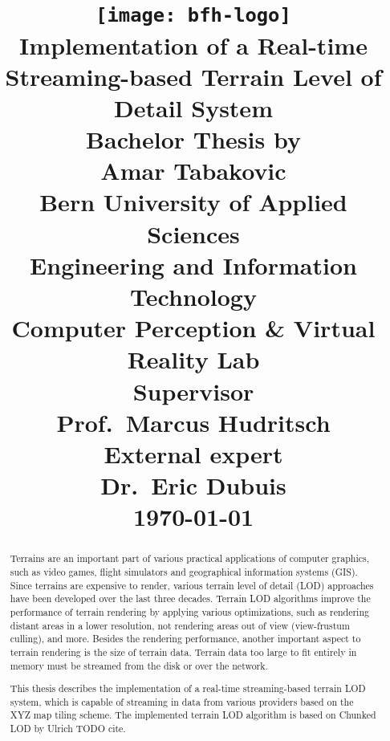 \documentclass[10pt,a4paper]{report}
\begin{document}
\title{
\vspace{-80px}
\texttt{[image: bfh-logo]}\\
\vspace{80px}
\huge\textsf{\textbf{Implementation of a Real-time Streaming-based Terrain Level of Detail System}}\\
\vspace{40px}
\large{Bachelor Thesis
by\\}
\vspace{10px}
\Large{Amar Tabakovic\\}
\vspace{20px}
\large{
\textbf{Bern University of Applied Sciences}\\
  Engineering and Information Technology\\
  Computer Perception \& Virtual Reality Lab
\\
\vspace{15px}
\textbf{Supervisor}\\
Prof.~Marcus Hudritsch\\
\vspace{15px}
\textbf{External expert}\\
Dr.~Eric Dubuis}\\
\vspace{20px}
\today
}

\date{}
\maketitle

\begin{abstract}
Terrains are an important part of various practical applications of computer graphics, such as
video games, flight simulators and geographical information systems (GIS).
Since terrains are expensive to render, various terrain level of detail (LOD) approaches have been developed
over the last three decades.
Terrain LOD algorithms improve the performance of terrain rendering 
by applying various optimizations, such as rendering distant areas in a lower resolution,
not rendering areas out of view (view-frustum culling), and more.
Besides the rendering performance, another important aspect to terrain rendering is the size of terrain data.
Terrain data too large to fit entirely in memory must be streamed 
from the disk or over the network.

This thesis describes the implementation of a real-time streaming-based terrain LOD system,
which is capable of streaming in data from various providers based on the XYZ map tiling scheme.
The implemented terrain LOD algorithm is based on Chunked LOD by Ulrich TODO cite.



\end{abstract}
\end{document}
